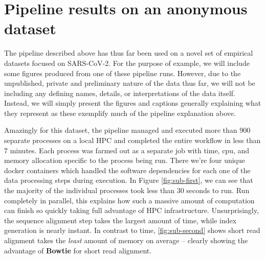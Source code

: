 \documentclass{article}
\begin{document}
\section*{Pipeline results on an anonymous dataset}

The pipeline described above has thus far been used on a novel set of empirical datasets focused on SARS-CoV-2.
For the purpose of example, we will include some figures produced from one of these pipeline runs.
However, due to the unpublished, private and preliminary nature of the data thus far, we will not be including any defining names, details, or interpretations of the data itself.
Instead, we will simply present the figures and captions generally explaining what they represent as these exemplify much of the pipeline explanation above.

Amazingly for this dataset, the pipeline managed and executed more than $900$ separate processes on a local HPC and completed the entire workflow in less than $7$ minutes.
Each process was farmed out as a separate job with time, cpu, and memory allocation specific to the process being run.
There we're four unique docker containers which handled the software dependencies for each one of the data processing steps during execution.
In Figure \ref{fig:sub-first}, we can see that the majority of the individual processes took less than 30 seconds to run.
Run completely in parallel, this explains how such a massive amount of computation can finish so quickly taking full advantage of HPC infrastructure.
Unsurprisingly, the sequence alignment step takes the largest amount of time, while index generation is nearly instant.
In contrast to time, \ref{fig:sub-second} shows short read alignment takes the \textit{least} amount of memory on average 
-- clearly showing the advantage of \textbf{Bowtie} for short read alignment.
\end{document}
